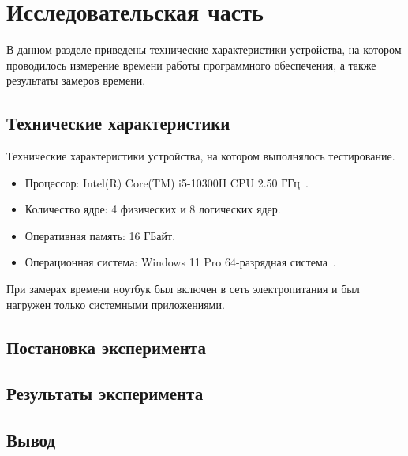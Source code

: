 \section{Исследовательская часть}

В данном разделе приведены технические характеристики устройства, на котором проводилось измерение времени работы программного обеспечения, а также результаты замеров времени.

\subsection{Технические характеристики}

Технические характеристики устройства, на котором выполнялось тестирование.
\begin{itemize}
	\item Процессор: Intel(R) Core(TM) i5-10300H CPU 2.50 ГГц~\cite{intel}.
	\item Количество ядре: 4 физических и 8 логических ядер.
	\item Оперативная память: 16 ГБайт.
	\item Операционная система: Windows 11 Pro 64-разрядная система~\cite{windows}.
\end{itemize}

При замерах времени ноутбук был включен в сеть электропитания и был нагружен только системными приложениями.

\subsection{Постановка эксперимента}

\subsection{Результаты эксперимента}

\subsection{Вывод}

